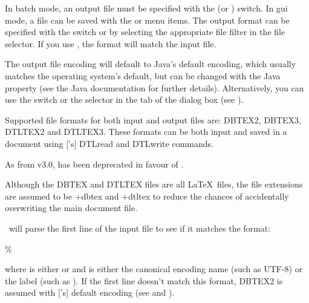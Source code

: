 In batch mode, an output file must be specified with the
 (or ) switch. In \gls{gui} mode, a file
can be saved with the  or  menu
items. The output format can be specified with the
 switch or by selecting the appropriate file
filter in the  file selector. If you use
, the format will match the input file.

The output file encoding will default to Java's default
encoding, which usually matches the operating system's default, but
can be changed with the Java  property (see the
Java documentation for further details). Alternatively, you can use
the  switch or the selector in the
 tab of the 
dialog box (see ).

Supported file formats for both input and output files are:
\gls{DBTEX2}, \gls{DBTEX3}, \gls{DTLTEX2} and \gls{DTLTEX3}.
These formats can be both input and saved in a document
using ['s] \gls{DTLread} and \gls{DTLwrite} commands.

\begin{information}
As from  v3.0,  has been deprecated
in \gls{favour} of
.
\end{information}

Although the DBTEX and DTLTEX files are all \LaTeX\ files, the file 
extensions are assumed to be \ext+{dbtex} and \ext+{dtltex} to
reduce the chances of accidentally overwriting the main document
file.

\appname\ will parse the first line of the input file to see if it
matches the format:
\begin{compactcodebox}
\%  
\end{compactcodebox}
where  is either  or  and
 is either the canonical encoding name (such as
UTF-8) or the  label (such as ).
If the first line doesn't match this format, \gls{DBTEX2} is
assumed with ['s] default encoding (see
 and ).

